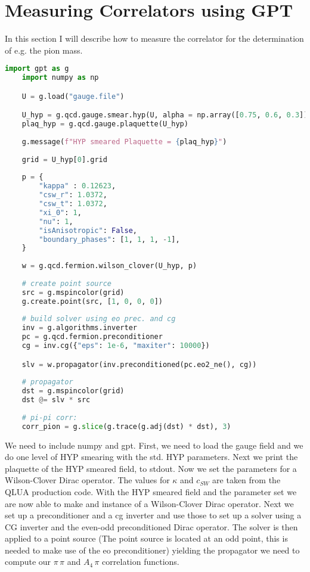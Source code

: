 \documentclass[a4paper,10pt]{scrartcl}
\begin{document}
\section{Measuring Correlators using GPT}
In this section I will describe how to measure the correlator for the determination of e.g. the pion mass.
\begin{lstlisting}[language=python]
    import gpt as g
    import numpy as np

    U = g.load("gauge.file")

    U_hyp = g.qcd.gauge.smear.hyp(U, alpha = np.array([0.75, 0.6, 0.3]))
    plaq_hyp = g.qcd.gauge.plaquette(U_hyp)
    
    g.message(f"HYP smeared Plaquette = {plaq_hyp}")
    
    grid = U_hyp[0].grid
    
    p = {
        "kappa" : 0.12623,
        "csw_r": 1.0372,
        "csw_t": 1.0372,
        "xi_0": 1,
        "nu": 1,
        "isAnisotropic": False,
        "boundary_phases": [1, 1, 1, -1],
    }
    
    w = g.qcd.fermion.wilson_clover(U_hyp, p)
    
    # create point source
    src = g.mspincolor(grid)
    g.create.point(src, [1, 0, 0, 0])
    
    # build solver using eo prec. and cg
    inv = g.algorithms.inverter
    pc = g.qcd.fermion.preconditioner
    cg = inv.cg({"eps": 1e-6, "maxiter": 10000})

    slv = w.propagator(inv.preconditioned(pc.eo2_ne(), cg))
 
    # propagator
    dst = g.mspincolor(grid)
    dst @= slv * src
    
    # pi-pi corr:
    corr_pion = g.slice(g.trace(g.adj(dst) * dst), 3)  

\end{lstlisting}
We need to include numpy and gpt. First, we need to load the gauge field and we do one level of HYP smearing with the std. HYP parameters.
Next we print the plaquette of the HYP smeared field, to stdout. Now we set the parameters for a Wilson-Clover Dirac operator. The
values for $\kappa$ and $c_{SW}$ are taken from the QLUA production code. With the HYP smeared field and the parameter set we are now
able to make and instance of a Wilson-Clover Dirac operator. Next we set up a preconditioner and a cg inverter and use those to set up
a solver using a CG inverter and the even-odd preconditioned Dirac operator. The solver is then applied to a point source (The point 
source is located at an odd point, this is needed to make use of the eo preconditioner) yielding the propagator we need to compute our
$\pi \, \pi$ and $A_4 \, \pi$ correlation functions. \newline
\end{document}
